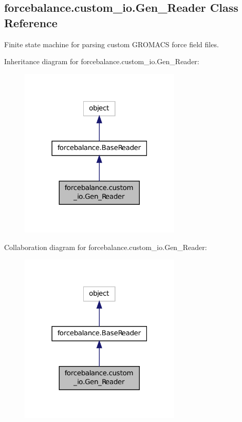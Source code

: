 \hypertarget{classforcebalance_1_1custom__io_1_1Gen__Reader}{\subsection{forcebalance.\-custom\-\_\-io.\-Gen\-\_\-\-Reader Class Reference}
\label{classforcebalance_1_1custom__io_1_1Gen__Reader}
}


Finite state machine for parsing custom G\-R\-O\-M\-A\-C\-S force field files.  




Inheritance diagram for forcebalance.\-custom\-\_\-io.\-Gen\-\_\-\-Reader\-:
\nopagebreak
\begin{figure}[H]
\begin{center}
\leavevmode
\includegraphics[width=218pt]{classforcebalance_1_1custom__io_1_1Gen__Reader__inherit__graph}
\end{center}
\end{figure}


Collaboration diagram for forcebalance.\-custom\-\_\-io.\-Gen\-\_\-\-Reader\-:
\nopagebreak
\begin{figure}[H]
\begin{center}
\leavevmode
\includegraphics[width=218pt]{classforcebalance_1_1custom__io_1_1Gen__Reader__coll__graph}
\end{center}
\end{figure}

